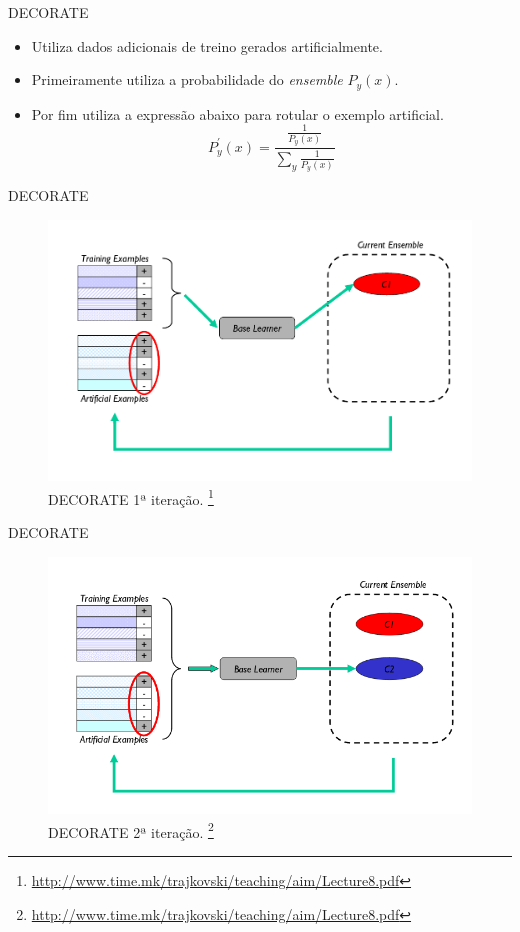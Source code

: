 \documentclass[brazil]{beamer}
\begin{document}
\begin{frame}{DECORATE}
   \begin{itemize}
\justifying
      \item Utiliza dados adicionais de treino gerados artificialmente.
\end{itemize}
      \begin{itemize}
\justifying
      \item <1 ->Primeiramente utiliza a probabilidade do \textit{ensemble} $P_y(x)$.
      \item <2 ->Por fim utiliza a expressão abaixo para rotular o exemplo artificial.
\begin{equation}
     P_{y}^{'}(x) = \frac{\frac{1}{P_y(x)}}{\sum\limits_y \frac{1}{P_y(x)}}
     \label{eq:decorate}
   \end{equation}
   \end{itemize}
\end{frame}

\begin{frame}{DECORATE}
   \begin{figure}[!htb] \centering 
     \centering
     \includegraphics[width=.8\columnwidth]{slide/decorate1} 
     \caption{DECORATE 1ª iteração. \footnote[frame]{\url{http://www.time.mk/trajkovski/teaching/aim/Lecture8.pdf}}} 
     \label{fig:decorate1}
   \end{figure}
\end{frame}

\begin{frame}{DECORATE}
\begin{figure}[!htb] \centering 
  \centering
  \includegraphics[width=.8\columnwidth]{slide/decorate2} 
  \caption{DECORATE 2ª iteração. \footnote[frame]{\url{http://www.time.mk/trajkovski/teaching/aim/Lecture8.pdf}}} 
  \label{fig:decorate2}
\end{figure}
\end{frame}
\end{document}
